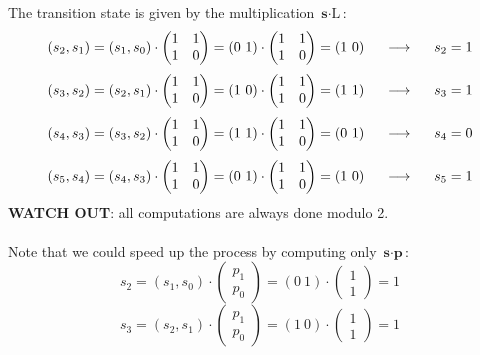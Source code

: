 \documentclass[11pt, a4paper]{article}
\newcommand{\consegue}{\hspace{0.5cm}\longrightarrow\hspace{0.5cm}}
\begin{document}
The transition state is given by the multiplication $\textbf{s}\cdot\text{L}$:
$$
    (s_2,s_1)=(s_1, s_0)\cdot
    \begin{pmatrix}
        1 & 1\\
        1 & 0
    \end{pmatrix}
    =(0\ 1)\cdot
    \begin{pmatrix}
        1 & 1\\
        1 & 0
    \end{pmatrix}
    =(1\ 0)
    \consegue s_2=1
$$
$$
    (s_3,s_2)=(s_2, s_1)\cdot
    \begin{pmatrix}
        1 & 1\\
        1 & 0
    \end{pmatrix}
    =(1\ 0)\cdot
    \begin{pmatrix}
        1 & 1\\
        1 & 0
    \end{pmatrix}
    =(1\ 1)
    \consegue s_3=1
$$
$$
    (s_4,s_3)=(s_3, s_2)\cdot
    \begin{pmatrix}
        1 & 1\\
        1 & 0
    \end{pmatrix}
    =(1\ 1)\cdot
    \begin{pmatrix}
        1 & 1\\
        1 & 0
    \end{pmatrix}
    =(0\ 1)
    \consegue s_4=0
$$
$$
    (s_5,s_4)=(s_4, s_3)\cdot
    \begin{pmatrix}
        1 & 1\\
        1 & 0
    \end{pmatrix}
    =(0\ 1)\cdot
    \begin{pmatrix}
        1 & 1\\
        1 & 0
    \end{pmatrix}
    =(1\ 0)
    \consegue s_5=1
$$
\textbf{WATCH OUT}: all computations are always done modulo 2.\\\\
Note that we could speed up the process by computing only $\textbf{s}\cdot\textbf{p}$:
$$
    s_2=(s_1, s_0)\cdot
    \begin{pmatrix}
        p_1\\
        p_0
    \end{pmatrix}=
    (0\ 1)\cdot
    \begin{pmatrix}
        1\\
        1
    \end{pmatrix}=1
$$
$$
    s_3=(s_2, s_1)\cdot
    \begin{pmatrix}
        p_1\\
        p_0
    \end{pmatrix}=
    (1\ 0)\cdot
    \begin{pmatrix}
        1\\
        1
    \end{pmatrix}=1
$$
\end{document}
